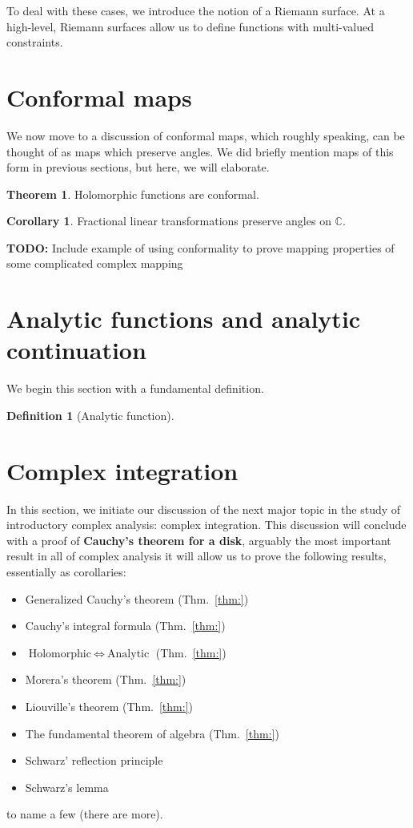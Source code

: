 \documentclass[aps,pra,showpacs,notitlepage,onecolumn,superscriptaddress,nofootinbib]{revtex4-1}
\theoremstyle{definition}
\newtheorem{definition}{Definition}[section]
\newtheorem{theorem}{Theorem}[section]
\newtheorem{corollary}{Corollary}[theorem]
\begin{document}
To deal with these cases, we introduce the notion of a Riemann surface. At a high-level, Riemann surfaces allow us to define functions
with multi-valued constraints.

\section{Conformal maps}

\noindent We now move to a discussion of conformal maps, which roughly speaking, can be thought of as maps which preserve angles. We did briefly mention maps
of this form in previous sections, but here, we will elaborate.

\begin{theorem}
  Holomorphic functions are conformal.
\end{theorem}

\begin{corollary}
  Fractional linear transformations preserve angles on $\mathbb{C}$.
\end{corollary}

\noindent \textbf{TODO:} Include example of using conformality to prove mapping properties of some complicated complex mapping

\section{Analytic functions and analytic continuation}

\noindent We begin this section with a fundamental definition.

\begin{definition}[Analytic function]
  \end{definition}

\section{Complex integration}

\noindent In this section, we initiate our discussion of the next major topic in the study of introductory complex analysis: complex integration.
This discussion will conclude with a proof of \textbf{Cauchy's theorem for a disk}, arguably the most important result in all of complex analysis it will allow us to
prove the following results, essentially as corollaries:
\begin{itemize}
\item Generalized Cauchy's theorem (Thm.~\ref{thm:})
\item Cauchy's integral formula (Thm.~\ref{thm:})
\item $\text{Holomorphic} \ \Leftrightarrow \ \text{Analytic}$ (Thm.~\ref{thm:})
\item Morera's theorem (Thm.~\ref{thm:})
\item Liouville's theorem (Thm.~\ref{thm:})
\item The fundamental theorem of algebra (Thm.~\ref{thm:})
\item Schwarz' reflection principle
\item Schwarz's lemma
\end{itemize}
to name a few (there are more).
\end{document}
